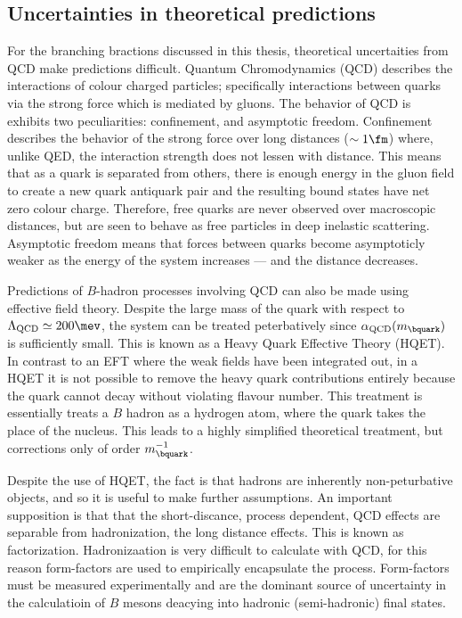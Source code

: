 \subsection{Uncertainties in theoretical predictions}
\cite{Pich:1998xt}

For the branching bractions discussed in this thesis, theoretical uncertaities from QCD make
predictions difficult.
Quantum Chromodynamics (QCD) describes the interactions of colour charged particles; specifically
interactions between quarks via the strong force which is mediated by gluons.
The behavior of QCD is exhibits two peculiarities: confinement, and asymptotic freedom.
Confinement describes the behavior of the strong force over long distances ($\sim1\fm$)
where, unlike QED, the interaction strength does not lessen with distance.
This means that as a quark is separated from others, there is enough energy in the gluon field to
create a new quark antiquark pair and the resulting bound states have net zero colour charge.
Therefore, free quarks are never observed over macroscopic distances, but are seen to behave as free
particles in deep inelastic scattering.
Asymptotic freedom means that forces between quarks become asymptoticly weaker as the energy of
the system increases --- and the distance decreases.

Predictions of $B$-hadron processes involving QCD can also be made using effective field theory.
Despite the large mass of the \bquark quark with respect to $\Lambda_\mathrm{QCD}\simeq200\mev$,
the system can be treated peterbatively since $\alpha_\mathrm{QCD}(m_\bquark)$ is sufficiently
small.
This is known as a Heavy Quark Effective Theory (HQET).
In contrast to an EFT where the weak fields have been integrated out, in a HQET
it is not possible to remove the heavy quark contributions entirely because the \bquark quark
cannot decay without violating flavour number.
This treatment is essentially treats a $B$ hadron as a hydrogen atom, where the \bquark quark takes
the place of the nucleus.
This leads to a highly simplified theoretical treatment, but corrections only of order
$m_\bquark^{-1}$.

Despite the use of HQET, the fact is that hadrons are inherently non-peturbative objects, and so
it is useful to make further assumptions.
An important supposition is that that the short-discance, process dependent, QCD effects are
separable from hadronization, the long distance effects.
This is known as factorization.
Hadronizaation is very difficult to calculate with QCD, for this reason form-factors are used to
empirically encapsulate the process.
Form-factors must be measured experimentally and are the dominant source of uncertainty in the
calculatioin of $B$ mesons deacying into hadronic (semi-hadronic) final states.





